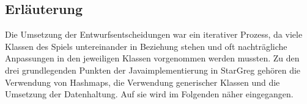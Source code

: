 \subsection{Erläuterung}
\label{sub:fachkonzept-implementierung-erläuterung}

Die Umsetzung der Entwurfsentscheidungen war ein iterativer Prozess, da viele Klassen des Spiels untereinander in Beziehung stehen und oft nachträgliche Anpassungen in den jeweiligen Klassen vorgenommen werden mussten. Zu den drei grundlegenden Punkten der Javaimplementierung in StarGreg gehören die Verwendung von Hashmaps, die Verwendung generischer Klassen und die Umsetzung der Datenhaltung. Auf sie wird im Folgenden näher eingegangen.





